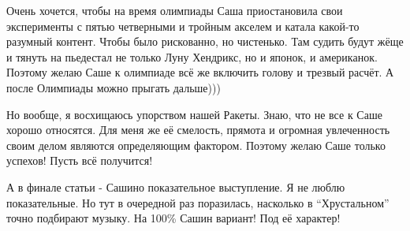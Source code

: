 Очень хочется, чтобы на время олимпиады Саша приостановила свои эксперименты с
пятью четверными и тройным акселем и катала какой-то разумный контент. Чтобы
было рискованно, но чистенько. Там судить будут жёще и тянуть на пьедестал не
только Луну Хендрикс, но и японок, и американок. Поэтому желаю Саше к олимпиаде
всё же включить голову и трезвый расчёт. А после Олимпиады можно прыгать
дальше)))

Но вообще, я восхищаюсь упорством нашей Ракеты. Знаю, что не все к Саше хорошо
относятся. Для меня же её смелость, прямота и огромная увлеченность своим делом
являются определяющим фактором. Поэтому желаю Саше только успехов! Пусть всё
получится! 

А в финале статьи - Сашино показательное выступление. Я не люблю показательные.
Но тут в очередной раз поразилась, насколько в \enquote{Хрустальном} точно подбирают
музыку. На 100\% Сашин вариант! Под её характер! 

